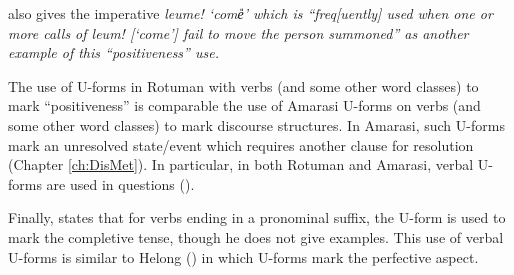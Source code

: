 \citet[95]{ch40} also gives the imperative \it{leume!} `come{\U}' which is
``freq[uently] used when one or more calls of \it{leum!} [`come{\M}']
fail to move the person summoned'' as another example of this ``positiveness'' use.

The use of U-forms in Rotuman with verbs (and some other word classes) to mark ``positiveness''
is comparable the use of Amarasi U-forms on verbs
(and some other word classes) to mark discourse structures.
In Amarasi, such U-forms mark an unresolved state/event
which requires another clause for resolution (Chapter \ref{ch:DisMet}).
In particular, in both Rotuman and Amarasi, verbal U-forms are used in questions ().

Finally, \citet[88]{ch40} states that for verbs ending in a pronominal suffix,
the U-form is used to mark the completive tense, though he does not give examples.
This use of verbal U-forms is similar to Helong ()
in which U-forms mark the perfective aspect.